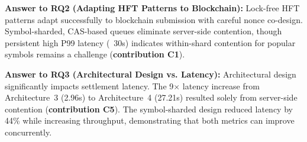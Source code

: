 \textbf{Answer to RQ2 (Adapting HFT Patterns to Blockchain):} Lock-free HFT patterns adapt successfully to blockchain submission with careful nonce co-design. Symbol-sharded, CAS-based queues eliminate server-side contention, though persistent high P99 latency (~30s) indicates within-shard contention for popular symbols remains a challenge (\textbf{contribution C1}).

\textbf{Answer to RQ3 (Architectural Design vs. Latency):} Architectural design significantly impacts settlement latency. The 9$\times$ latency increase from Architecture~3 (2.96s) to Architecture~4 (27.21s) resulted solely from server-side contention (\textbf{contribution C5}). The symbol-sharded design reduced latency by 44\% while increasing throughput, demonstrating that both metrics can improve concurrently.


